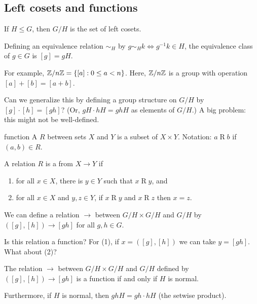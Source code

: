 \documentclass[12pt,letterpaper]{report}
\begin{document}
\subsection{Left cosets and functions}

If $H \leq G$, then $G/H$ is the set of left cosets.

Defining an equivalence relation $\sim_H$ by $g \sim_H k \iff g^{-1}k \in H$, the equivalence class
of $g \in G$ is $[g] = gH$.

For example, $\mathbb{Z}/{n}\mathbb{Z} = \{[a] : 0 \leq a < n\}$.
Here, $\mathbb{Z}/{n}\mathbb{Z}$ is a group with operation $[a] + [b] = [a + b]$.

Can we generalize this by defining a group structure on $G/H$ by $[g] \cdot [h] = [gh]$?
(Or, $gH \cdot hH = ghH$ as elements of $G/H$.)
A big problem: this might not be well-defined.

\begin{defn}{function}{}
  A  $R$ between sets $X$ and $Y$ is a subset of $X \times Y$.
  Notation: $a \mathrel{R} b$ if $(a, b) \in R$.

  A relation $R$ is a  from $X \to Y$ if
  \begin{enumerate}
    \item for all $x \in X$, there is $y \in Y$ such that $x \mathrel{R} y$, and
    \item for all $x \in X$ and $y, z \in Y$, if $x \mathrel{R} y$ and $x \mathrel{R} z$ then
      $x = z$.
  \end{enumerate}
\end{defn}

We can define a relation $\to$ between $G/H \times G/H$ and $G/H$ by $([g], [h]) \to [gh]$ for all
$g, h \in G$.

Is this relation a function?
For (1), if $x = ([g], [h])$ we can take $y = [gh]$.
What about (2)?

\begin{lem}{}{}
  The relation $\to$ between $G/H \times G/H$ and $G/H$ defined by $([g], [h]) \to [gh]$ is a
  function if and only if $H$ is normal.

  Furthermore, if $H$ is normal, then $ghH = gh \cdot hH$ (the setwise product).
\end{lem}
\end{document}
